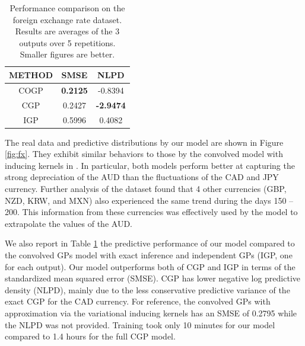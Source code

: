 \setlength{\tabcolsep}{4pt}
\begin{table}[t]
\caption{Performance comparison on the foreign exchange rate dataset. Results are averages of the 3 outputs over 5 repetitions. Smaller figures are better.}
\label{tab:fx}
\begin{center}
\begin{tabular}{ccc}
\toprule
\textbf{METHOD} & \textbf{SMSE} & \textbf{NLPD} \\ \hline
COGP  & \textbf{0.2125} & -0.8394 \\
CGP & 0.2427 & \textbf{-2.9474} \\
IGP & 0.5996 & 0.4082 \\
\bottomrule
\end{tabular}
\end{center}
\end{table}

The real data and predictive distributions by our model are shown in Figure \ref{fig:fx}.
They exhibit similar behaviors to those by the convolved model with inducing kernels in \citet{alvarez2010efficient}.
In particular, both models perform better at capturing the strong depreciation of the AUD than the fluctuations of the CAD and JPY currency.
Further analysis of the dataset found that 4 other currencies (GBP, NZD, KRW, and MXN) also experienced the same trend during the days 
150 -- 200.
This information from these currencies was effectively used by the model to extrapolate the values of the AUD.

We also report in Table \ref{tab:fx} the predictive performance of our model compared to the convolved GPs model with exact inference \citep[CGP,][]{alvarez-lawrence-nips-08} and independent GPs (IGP, one for each output).
Our model outperforms both of CGP and IGP in terms of the standardized mean squared error (SMSE).
CGP has lower negative log predictive density (NLPD), mainly due to the less conservative predictive variance of the exact CGP for the CAD currency.
For reference, the convolved GPs with approximation via the variational inducing kernels  \citep[CGPVAR,][]{alvarez2010efficient} 
has an SMSE of 0.2795 while the NLPD was not provided.
Training took only 10 minutes for our model compared to 1.4 hours for the full CGP model.

